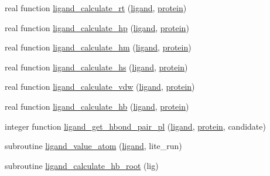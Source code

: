 \begin{DoxyCompactItemize}
\item 
real function \hyperlink{classcalc__xscore_ae90bcd78537c184a3f1470f60b04fb1f}{ligand\-\_\-calculate\-\_\-rt} (\hyperlink{classcalc__xscore_ad2efc1238a463be4b83681419cd6b113}{ligand}, \hyperlink{classcalc__xscore_a98803b585e24ba9794bf16dc263374dc}{protein})
\item 
real function \hyperlink{classcalc__xscore_a55700e2483d6a735ce980eeedc8b86f4}{ligand\-\_\-calculate\-\_\-hp} (\hyperlink{classcalc__xscore_ad2efc1238a463be4b83681419cd6b113}{ligand}, \hyperlink{classcalc__xscore_a98803b585e24ba9794bf16dc263374dc}{protein})
\item 
real function \hyperlink{classcalc__xscore_a93a92dba0cb176faabb5c14f887ab2c9}{ligand\-\_\-calculate\-\_\-hm} (\hyperlink{classcalc__xscore_ad2efc1238a463be4b83681419cd6b113}{ligand}, \hyperlink{classcalc__xscore_a98803b585e24ba9794bf16dc263374dc}{protein})
\item 
real function \hyperlink{classcalc__xscore_aff087fd515634edbf8fcd35caca1593a}{ligand\-\_\-calculate\-\_\-hs} (\hyperlink{classcalc__xscore_ad2efc1238a463be4b83681419cd6b113}{ligand}, \hyperlink{classcalc__xscore_a98803b585e24ba9794bf16dc263374dc}{protein})
\item 
real function \hyperlink{classcalc__xscore_a3ce2abd7feaec5ed7c7c15f3ed6dc38b}{ligand\-\_\-calculate\-\_\-vdw} (\hyperlink{classcalc__xscore_ad2efc1238a463be4b83681419cd6b113}{ligand}, \hyperlink{classcalc__xscore_a98803b585e24ba9794bf16dc263374dc}{protein})
\item 
real function \hyperlink{classcalc__xscore_aec79b7e53911e002ecaae12b252c93e0}{ligand\-\_\-calculate\-\_\-hb} (\hyperlink{classcalc__xscore_ad2efc1238a463be4b83681419cd6b113}{ligand}, \hyperlink{classcalc__xscore_a98803b585e24ba9794bf16dc263374dc}{protein})
\item 
integer function \hyperlink{classcalc__xscore_ae97596aac5895fa621029e53165c933a}{ligand\-\_\-get\-\_\-hbond\-\_\-pair\-\_\-pl} (\hyperlink{classcalc__xscore_ad2efc1238a463be4b83681419cd6b113}{ligand}, \hyperlink{classcalc__xscore_a98803b585e24ba9794bf16dc263374dc}{protein}, candidate)
\item 
subroutine \hyperlink{classcalc__xscore_a0e46016e4d4ad20b05df5806ae4b4c70}{ligand\-\_\-value\-\_\-atom} (\hyperlink{classcalc__xscore_ad2efc1238a463be4b83681419cd6b113}{ligand}, lite\-\_\-run)
\item 
subroutine \hyperlink{classcalc__xscore_a74f0979979ed49276119761b0fee9e00}{ligand\-\_\-calculate\-\_\-hb\-\_\-root} (lig)
\item 

\end{DoxyCompactItemize}
